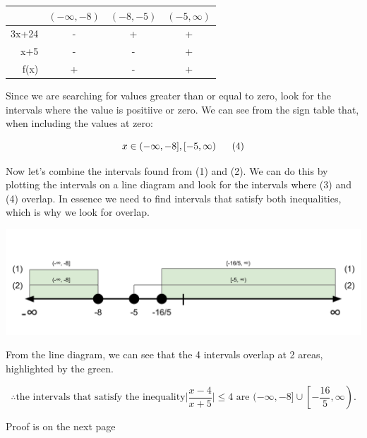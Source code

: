 \documentclass[12pt]{book}
\begin{document}
\begin{enumerate}
\begin{center}
    \begin{tabular}{|r|c|c|c|}
        \hline
        & $(-\infty, -8)$ & $(-8, -5)$ & $(-5, \infty)$ \\ \hline
        3x+24 & - & + & + \\ \hline
        x+5 & - & - & + \\ \hline
        f(x) & + & - & + \\ \hline
    \end{tabular}
\end{center}

\vspace{0.3cm}

Since we are searching for values greater than or equal to zero,
 look for the intervals where the value is positiive or zero. We can see
  from the sign table that, when including the values at zero:

$$x \in (-\infty, -8], [-5, \infty) \text{\space\space\space\space\space} (4)$$
\vspace{0.1cm}

Now let's combine the intervals found from (1) and (2). We can do this by 
plotting the intervals on a line diagram and look for the intervals where
(3) and (4) overlap. In essence we need to find intervals that satisfy both 
inequalities, which is why we look for overlap.

\includegraphics[width=\linewidth]{A2-5 Line Diagram (1).png}

From the line diagram, we can see that the 4 intervals overlap at 2 areas,
 highlighted by the green.
 
$$\boxed{\therefore \text{the intervals that satisfy the inequality} \bigg|\dfrac{x-4}{x+5}\bigg| \le 4 \text{ are } (-\infty , -8] \cup \left[ -\dfrac{16}{5}, \infty \right) \text{.}}$$

\vspace{2cm}
\begin{center}
    Proof is on the next page
\end{center}

\newpage


\end{enumerate}
\end{document}
